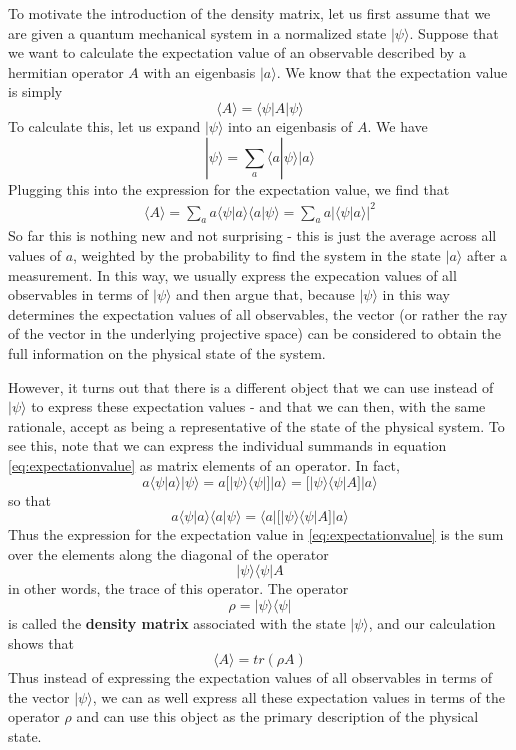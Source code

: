 \documentclass[a4paper, draft]{article}
\theoremstyle{own}
\theoremstyle{remark}
\begin{document}
To motivate the introduction of the density matrix, let us first assume that we are given a quantum mechanical system in a normalized state $|\psi \rangle$. Suppose that we want to calculate the expectation value of an observable described by a hermitian operator $A$ with an eigenbasis $|a \rangle$. We know that the expectation value is simply
$$
\langle A \rangle = \langle \psi | A | \psi \rangle 
$$
To calculate this, let us expand $|\psi \rangle$ into an eigenbasis of $A$. We have
$$
|\psi \rangle = \sum_a \langle a | \psi \rangle |a \rangle
$$
Plugging this into the expression for the expectation value, we find that
\begin{align}\label{eq:expectationvalue}
\langle A \rangle = \sum_a a \langle \psi | a \rangle \langle a | \psi \rangle 
= \sum_a a |\langle \psi | a \rangle |^2
\end{align}
So far this is nothing new and not surprising - this is just the average across all values of $a$, weighted by the probability to find the system in the state $|a \rangle$ after a measurement. In this way, we usually express the expecation values of all observables in terms of $|\psi \rangle$ and then argue that, because $|\psi \rangle$ in this way determines the expectation values of all observables, the vector (or rather the ray of the vector in the underlying projective space) can be considered to obtain the full information on the physical state of the system.

However, it turns out that there is a different object that we can use instead of $|\psi \rangle$ to express these expectation values - and that we can then, with the same rationale, accept as being a representative of the state of the physical system. To see this, note that we can express the individual summands in  equation \eqref{eq:expectationvalue} as matrix elements of an operator. In fact,
$$
a \langle \psi | a \rangle  | \psi \rangle   = a \big[ |\psi \rangle \langle \psi |\big] |a \rangle 
=  \big[ |\psi \rangle \langle \psi | A \big] |a \rangle 
$$
so that
$$
a \langle \psi | a \rangle \langle a | \psi \rangle  = 
\langle a | \big[ |\psi \rangle \langle \psi | A \big] 
|a \rangle
$$
Thus the expression for the expectation value in \eqref{eq:expectationvalue} is the sum over the elements along the diagonal of the operator
$$
|\psi \rangle \langle \psi | A
$$
in other words, the trace of this operator. The operator 
$$
\rho = |\psi \rangle \langle \psi |
$$
is called the {\bf density matrix} associated with the state $|\psi \rangle$, and our calculation shows that 
$$
\langle A \rangle = tr(\rho A)
$$
Thus instead of expressing the expectation values of all observables in terms of the vector $|\psi \rangle$, we can as well express all these expectation values in terms of the operator $\rho$ and can use this object as the primary description of the physical state.
\end{document}
